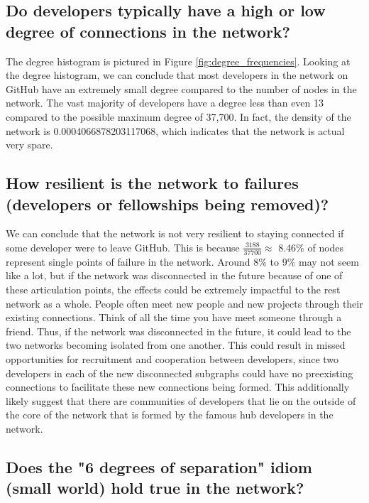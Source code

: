 \documentclass[9pt,twocolumn,twoside]{pnas-new}
\begin{document}
\subsection{Do developers typically have a high or low degree of connections in the network?}

The degree histogram is pictured in Figure \ref{fig:degree_frequencies}. Looking at the degree histogram, we can conclude that most developers in the network on GitHub have an extremely small degree compared to the number of nodes in the network. The vast majority of developers have a degree less than even 13 compared to the possible maximum degree of 37,700. In fact, the density of the network is 0.0004066878203117068, which indicates that the network is actual very spare.

\subsection{How resilient is the network to failures (developers or fellowships being removed)?}

We can conclude that the network is not very resilient to staying connected if some developer were to leave GitHub. This is because $\frac{3188}{37700} \approx$ 8.46\% of nodes represent single points of failure in the network. Around 8\% to 9\% may not seem like a lot, but if the network was disconnected in the future because of one of these articulation points, the effects could be extremely impactful to the rest network as a whole. People often meet new people and new projects through their existing connections. Think of all the time you have meet someone through a friend. Thus, if the network was disconnected in the future, it could lead to the two networks becoming isolated from one another. This could result in missed opportunities for recruitment and cooperation between developers, since two developers in each of the new disconnected subgraphs could have no preexisting connections to facilitate these new connections being formed. This additionally likely suggest that there are communities of developers that lie on the outside of the core of the network that is formed by the famous hub developers in the network.

\subsection{Does the "6 degrees of separation" idiom (small world) hold true in the network?}
\end{document}
